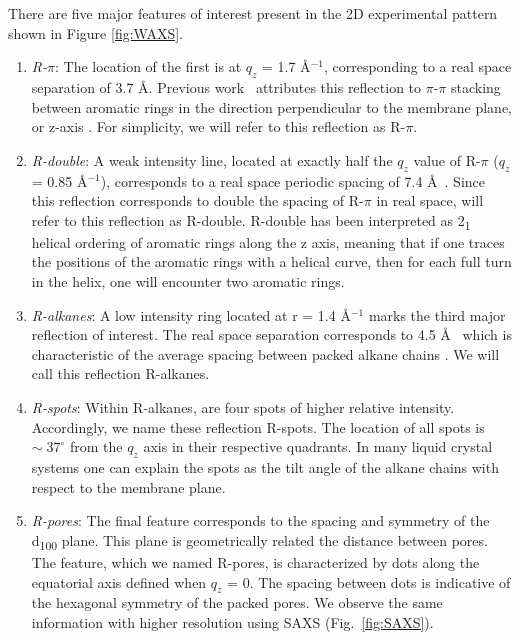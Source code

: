 \documentclass[journal=jpcbfk,manusciprt=article]{achemso}
\begin{document}
  There are five major features of interest present in the 2D experimental pattern shown 
  in Figure \ref{fig:WAXS}.

  \begin{enumerate} 
  
	\item \textit{R-$\pi$}: The location of the first is at $q_z$ = 1.7
	\AA$^{-1}$, corresponding to a real space separation of 3.7 {\AA}. Previous
	work~\cite{feng_scalable_2014} attributes this reflection to $\pi$-$\pi$
	stacking between aromatic rings in the direction perpendicular to the membrane
	plane, or z-axis \cite{feng_scalable_2014}. For simplicity, we will refer to
	this reflection as R-$\pi$.
 
	\item \textit{R-double}: A weak intensity line, located at exactly half
	the $q_z$ value of R-$\pi$ ($q_z$ = 0.85 \AA$^{-1}$), corresponds to a real
	space periodic spacing of 7.4 \AA~. Since this reflection corresponds to double
	the spacing of R-$\pi$ in real space, will refer to this reflection as R-double. 
	R-double has been interpreted as 2\textsubscript{1} helical ordering of aromatic
	rings along the z axis\cite{feng_scalable_2014}, meaning that if one traces the 
	positions of the aromatic rings with a helical curve, then for each full turn 
	in the helix, one will encounter two aromatic rings.

	\item \textit{R-alkanes}: A low intensity ring located at r = 1.4
	\AA$^{-1}$ marks the third major reflection of interest. The real space
	separation corresponds to 4.5 \AA~ which is characteristic of the average
	spacing between packed alkane chains \cite{mcintosh_organization_1980}. We will
	call this reflection R-alkanes.

	\item \textit{R-spots}: Within R-alkanes, are four spots of higher
	relative intensity.  Accordingly, we name these reflection R-spots. The
	location of all spots is $\sim\;37^{\circ}$ from the $q_z$ axis in their
	respective quadrants. In many liquid crystal systems one can explain the spots
	as the tilt angle of the alkane chains with respect to the membrane
	plane\cite{govind_simple_2001}.
 
	\item \textit{R-pores}: The final feature corresponds to the spacing
	and symmetry of the d\textsubscript{100} plane. This plane is geometrically
	related the distance between pores. The feature, which we named R-pores, is
	characterized by dots along the equatorial axis defined when $q_z$ = 0. The
	spacing between dots is indicative of the hexagonal symmetry of the packed
	pores. We observe the same information with higher resolution using SAXS
	(Fig.~\ref{fig:SAXS}). 

  \end{enumerate}
\end{document}
